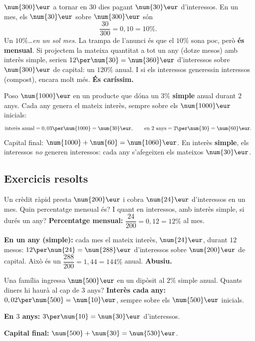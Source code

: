 \begin{exemple}
$\num{300}\eur$ a tornar en $30$ dies pagant $\num{30}\eur$ d'interessos. En un mes,
els $\num{30}\eur$ sobre $\num{300}\eur$ són
\[
\frac{\num{30}}{\num{300}}=0,10=10\%.
\]
Un $10\%$\dots \emph{en un sol mes}. La trampa de l'anunci és que el $10\%$ sona poc,
però \textbf{és mensual}. Si projectem la mateixa quantitat a tot un any (dotze mesos)
amb interès simple, serien $12\per\num{30}=\num{360}\eur$ d'interessos sobre
$\num{300}\eur$ de capital: un $120\%$ anual. I si els interessos generessin
interessos (compost), encara molt més. \textbf{És caríssim.}
\end{exemple}

\begin{exemple}
Poso $\num{1000}\eur$ en un producte que dóna un $3\%$ \textbf{simple} anual durant
$2$ anys. Cada any genera el mateix interès, sempre sobre els $\num{1000}\eur$
inicials:
\[
\text{interès anual}=0,03\per\num{1000}=\num{30}\eur,\qquad
\text{en $2$ anys}=2\per\num{30}=\num{60}\eur.
\]
Capital final: $\num{1000}+\num{60}=\num{1060}\eur$. En interès \textbf{simple}, els
interessos \emph{no} generen interessos: cada any s'afegeixen els mateixos
$\num{30}\eur$.
\end{exemple}

\subsection{Exercicis resolts}

\begin{exresolt}
Un crèdit ràpid presta $\num{200}\eur$ i cobra $\num{24}\eur$ d'interessos en un mes.
Quin percentatge mensual és? I quant en interessos, amb interès simple, si durés un
any?
\solucio
\textbf{Percentatge mensual:} $\dfrac{\num{24}}{\num{200}}=0,12=12\%$ al mes.

\textbf{En un any (simple):} cada mes el mateix interès, $\num{24}\eur$, durant $12$
mesos: $12\per\num{24}=\num{288}\eur$ d'interessos sobre $\num{200}\eur$ de capital.
Això és un $\dfrac{\num{288}}{\num{200}}=1,44=144\%$ anual. \textbf{Abusiu.}
\end{exresolt}

\begin{exresolt}
Una família ingressa $\num{500}\eur$ en un dipòsit al $2\%$ simple anual. Quants
diners hi haurà al cap de $3$ anys?
\solucio
\textbf{Interès cada any:} $0,02\per\num{500}=\num{10}\eur$, sempre sobre els
$\num{500}\eur$ inicials.

\textbf{En $3$ anys:} $3\per\num{10}=\num{30}\eur$ d'interessos.

\textbf{Capital final:} $\num{500}+\num{30}=\num{530}\eur$.
\end{exresolt}

